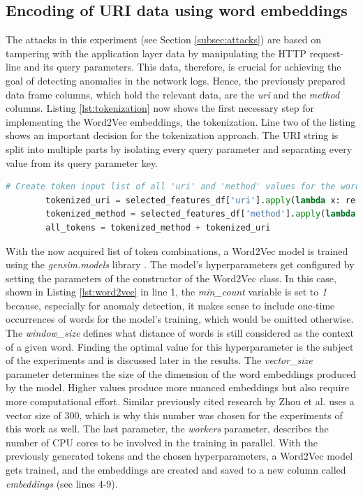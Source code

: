 \documentclass[
    fontsize=12pt,
    headings=small,
    parskip=half,           %
    bibliography=totoc,
    numbers=noenddot,       %
    open=any,               %
    ]{scrreprt}
\begin{document}
\subsection{Encoding of URI data using word embeddings}
The attacks in this experiment (see Section \ref{subsec:attacks}) are based on tampering with the application layer data by manipulating the HTTP request-line and its query parameters. This data, therefore, is crucial for achieving the goal of detecting anomalies in the network logs. Hence, the previously prepared data frame columns, which hold the relevant data, are the \emph{uri} and the \emph{method} columns. Listing \ref{lst:tokenization} now shows the first necessary step for implementing the Word2Vec embeddings, the tokenization. Line two of the listing shows an important decision for the tokenization approach. The URI string is split into multiple parts by isolating every query parameter and separating every value from its query parameter key.

\begin{minipage}\linewidth
	\begin{lstlisting}[language={python}, caption={Tokenization of the features for word embeddings}, label={lst:tokenization}] 
		# Create token input list of all 'uri' and 'method' values for the word2vec model
		tokenized_uri = selected_features_df['uri'].apply(lambda x: re.split('[/?&=]', x))
		tokenized_method = selected_features_df['method'].apply(lambda x: [x])
		all_tokens = tokenized_method + tokenized_uri
	\end{lstlisting}
\end{minipage}


With the now acquired list of token combinations, a Word2Vec model is trained using the \emph{gensim.models} library \cite{gensim2021}. The model's hyperparameters get configured by setting the parameters of the constructor of the Word2Vec class. In this case, shown in Listing \ref{lst:word2vec} in line 1, the \emph{min\_count} variable is set to \emph{1} because, especially for anomaly detection, it makes sense to include one-time occurrences of words for the model's training, which would be omitted otherwise. The \emph{window\_size} defines what distance of words is still considered as the context of a given word. Finding the optimal value for this hyperparameter is the subject of the experiments and is discussed later in the results. The \emph{vector\_size} parameter determines the size of the dimension of the word embeddings produced by the model. Higher values produce more nuanced embeddings but also require more computational effort. Similar previously cited research by Zhou et al. \cite{zhuo2017network} uses a vector size of 300, which is why this number was chosen for the experiments of this work as well. The last parameter, the \emph{workers} parameter, describes the number of CPU cores to be involved in the training in parallel. With the previously generated tokens and the chosen hyperparameters, a Word2Vec model gets trained, and the embeddings are created and saved to a new column called \emph{embeddings} (see lines 4-9).
\end{document}
